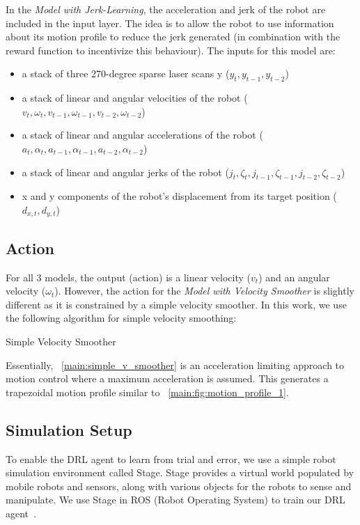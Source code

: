 In the \textit{Model with Jerk-Learning}, the acceleration and jerk of the robot are included in the input layer. The idea is to allow the robot to use information about its motion profile to reduce the jerk generated (in combination with the reward function to incentivize this behaviour). The inputs for this model are:
\begin{itemize}
\item a stack of three 270-degree sparse laser scans y ($y_{t}, y_{t-1}, y_{t-2}$)
\item a stack of linear and angular velocities of the robot ($v_{t}, \omega_{t}, v_{t-1}, \omega_{t-1}, v_{t-2}, \omega_{t-2}$)
\item a stack of linear and angular accelerations of the robot ($a_{t}, \alpha_{t}, a_{t-1}, \alpha_{t-1}, a_{t-2}, \alpha_{t-2}$)
\item a stack of linear and angular jerks of the robot ($j_{t}, \zeta_{t}, j_{t-1}, \zeta_{t-1}, j_{t-2}, \zeta_{t-2}$)
\item x and y components of the robot's displacement from its target position ($d_{x,t}, d_{y,t}$)
\end{itemize}

\subsection{Action}
For all 3 models, the output (action) is a linear velocity ($v_t$) and an angular velocity ($\omega_{t}$). However, the action for the \textit{Model with Velocity Smoother} is slightly different as it is constrained by a simple velocity smoother. In this work, we use the following algorithm for simple velocity smoothing:

\begin{algorithm}
\caption{Simple Velocity Smoother}
\label{main:simple_v_smoother}
\end{algorithm}

Essentially, ~\autoref{main:simple_v_smoother} is an acceleration limiting approach to motion control where a maximum acceleration is assumed. This generates a trapezoidal motion profile similar to ~\autoref{main:fig:motion_profile_1}. 

\subsection{Simulation Setup}
To enable the DRL agent to learn from trial and error, we use a simple robot simulation environment called Stage. Stage provides a virtual world populated by mobile robots and sensors, along with various objects for the robots to sense and manipulate. We use Stage in ROS (Robot Operating System) to train our DRL agent~\cite{gerkey_playerstage_nodate}.

